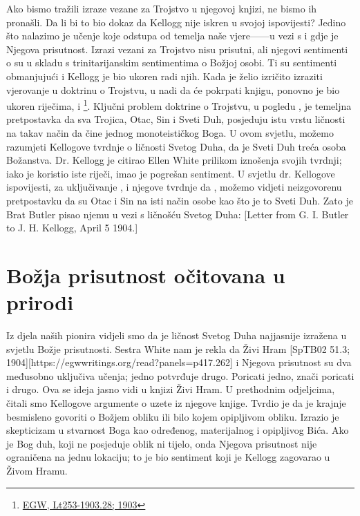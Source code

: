 Ako bismo tražili izraze vezane za Trojstvo u njegovoj knjizi, ne bismo ih pronašli. Da li bi to bio dokaz da Kellogg nije iskren u svojoj ispovijesti? Jedino što nalazimo je učenje koje odstupa od temelja naše vjere——u vezi s  i gdje je Njegova prisutnost. Izrazi vezani za Trojstvo nisu prisutni, ali njegovi sentimenti o  su u skladu s trinitarijanskim sentimentima o Božjoj osobi. Ti su sentimenti obmanjujući i Kellogg je bio ukoren radi njih. Kada je želio izričito izraziti vjerovanje u doktrinu o Trojstvu, u nadi da će pokrpati knjigu, ponovno je bio ukoren riječima,  i \footnote{\href{https://egwwritings.org/?ref=en_Lt253-1903.28&para=9980.36}{EGW, Lt253-1903.28; 1903}}. Ključni problem doktrine o Trojstvu, u pogledu , je temeljna pretpostavka da sva Trojica, Otac, Sin i Sveti Duh, posjeduju istu vrstu ličnosti na takav način da čine jednog monoteističkog Boga. U ovom svjetlu, možemo razumjeti Kellogove tvrdnje o ličnosti Svetog Duha, da je Sveti Duh treća osoba Božanstva. Dr. Kellogg je citirao Ellen White prilikom iznošenja svojih tvrdnji; iako je koristio iste riječi, imao je pogrešan sentiment. U svjetlu dr. Kellogove ispovijesti, za uključivanje , i njegove tvrdnje da , možemo vidjeti neizgovorenu pretpostavku da su Otac i Sin na isti način osobe kao što je to Sveti Duh. Zato je Brat Butler pisao njemu u vezi s ličnošću Svetog Duha: [Letter from G. I. Butler to J. H. Kellogg, April 5 1904.]

\section*{Božja prisutnost očitovana u prirodi}

Iz djela naših pionira vidjeli smo da je ličnost Svetog Duha najjasnije izražena u svjetlu Božje prisutnosti. Sestra White nam je rekla da Živi Hram [SpTB02 51.3; 1904][https://egwwritings.org/read?panels=p417.262]  i Njegova prisutnost su dva međusobno uključiva učenja; jedno potvrđuje drugo. Poricati jedno, znači poricati i drugo. Ova se ideja jasno vidi u knjizi Živi Hram. U prethodnim odjeljcima, čitali smo Kellogove argumente o  uzete iz njegove knjige. Tvrdio je da je krajnje besmisleno govoriti o Božjem obliku ili bilo kojem opipljivom obliku. Izrazio je skepticizam u stvarnost Boga kao određenog, materijalnog i opipljivog Bića. Ako je Bog duh, koji ne posjeduje oblik ni tijelo, onda Njegova prisutnost nije ograničena na jednu lokaciju; to je bio sentiment koji je Kellogg zagovarao u Živom Hramu.

